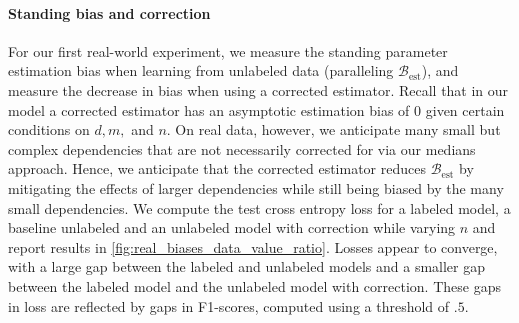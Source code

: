 \vspace{-0.5em}
\paragraph{Standing bias and correction} For our first real-world experiment, we measure the standing parameter estimation bias when learning from unlabeled data (paralleling $\mathcal{B}_\text{est}$), and measure the decrease in  bias when using a corrected estimator. Recall that in our model a corrected estimator has an asymptotic estimation bias of $0$ given certain conditions on $d, m,$ and $n$. %
On real data, however, we anticipate many small but complex dependencies that are not necessarily corrected for via our medians approach. 
Hence, we anticipate that the corrected estimator reduces $\mathcal{B}_\text{est}$ by mitigating the effects of larger dependencies while still being biased by the many small dependencies. We compute the test cross entropy loss for a labeled model, a baseline unlabeled and an unlabeled model with correction while varying $n$ and report results in \autoref{fig:real_biases_data_value_ratio}. Losses appear to converge, with a large gap between the labeled and unlabeled models and a smaller gap between the labeled model and the unlabeled model with correction. These gaps in loss are reflected by gaps in F1-scores, computed using a threshold of $.5$.

